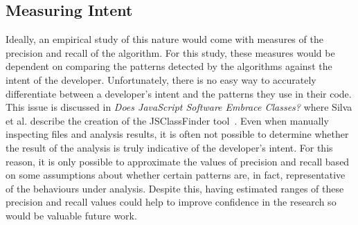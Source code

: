 \subsection{Measuring Intent}
Ideally, an empirical study of this nature would come with measures of the precision and recall of the algorithm. For this study, these measures would be dependent on comparing the patterns detected by the algorithms against the intent of the developer. Unfortunately, there is no easy way to accurately differentiate between a developer's intent and the patterns they use in their code. This issue is discussed in \textit{Does JavaScript Software Embrace Classes?} where Silva et al. describe the creation of the JSClassFinder tool~\cite{JSClassFinder}. Even when manually inspecting files and analysis results, it is often not possible to determine whether the result of the analysis is truly indicative of the developer's intent. For this reason, it is only possible to approximate the values of precision and recall based on some assumptions about whether certain patterns are, in fact, representative of the behaviours under analysis. Despite this, having estimated ranges of these precision and recall values could help to improve confidence in the research so would be valuable future work.
